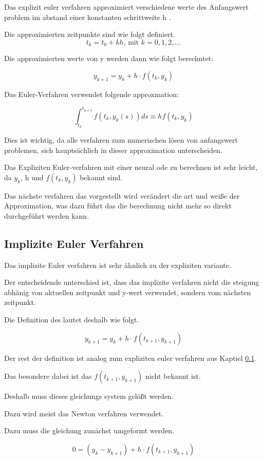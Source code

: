 Das explizit euler verfahren approximiert verschiedene werte des Anfangswert problem 
im abstand einer konstanten schrittweite h .

Die approximierten zeitpunkte sind wie folgt definiert.
$$
t_k = t_0 + kh \text{, mit } k = 0, 1, 2, ...
$$

Die approximierten werte von y werden dann wie folgt berechntet:

$$
y_{k + 1} = y_{k} + h \cdot f(t_k, y_k)
$$

Das Euler-Verfahren verwendet folgende approxmation:

$$
\int_{t_k}^{t_{k+1}} f(t_k, y_k(s)) ds \approx h f(t_k, y_k)
$$

Dies ist wichtig, da alle verfahren zum numerischen lösen von anfangswert problemen, sich hauptsächlich in dieser approximation unterscheiden.

Das Expliziten Euler-verfahren mit einer neural ode zu berechnen
ist sehr leicht, da $y_k$, h und $f(t_k, y_k)$ bekannt sind.

Das nächste verfahren das vorgestellt wird verändert die art und weiße der Approximation, was dazu führt das die berechnung nicht mehr so direkt durchgeführt werden kann.



\subsection{Implizite Euler Verfahren}

Das implizite Euler verfahren ist sehr ähnlich zu der expliziten variante.

Der entscheidende unterschied ist, dass das implizite verfahren nicht die steigung abhänig von aktuellen 
zeitpunkt und y-wert verwendet, sondern vom nächsten zeitpunkt.

Die Definition des lautet deshalb wie folgt.

$$
y_{k + 1} = y_k + h \cdot f(t_{k + 1}, y_{k + 1})
$$

Der rest der definition ist analog zum expliziten euler verfahren aus Kaptiel \ref{}.

Das besondere dabei ist das $f(t_{k + 1}, y_{k + 1})$ nicht bekannt ist.

Deshalb muss dieses gleichungs system gelößt werden.

Dazu wird meist das Newton verfahren verwendet.

Dazu muss die gleichung zunächst umgeformt werden.

$$
0 = (y_k - y_{k + 1})  + h \cdot f(t_{k + 1}, y_{k + 1})
$$

